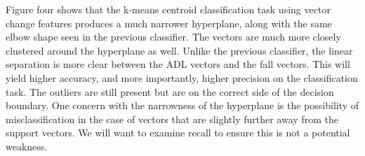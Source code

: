 \documentclass{llncs}
\begin{document}
    
		
	Figure four shows that the k-means centroid classification task using vector change features produces a much narrower hyperplane, along with the same elbow shape seen in the previous classifier. The vectors are much more closely clustered around the hyperplane as well. Unlike the previous classifier, the linear separation is more clear between the ADL vectors and the fall vectors. This will yield higher accuracy, and more importantly, higher precision on the classification task. The outliers are still present but are on the correct side of the decision boundary. One concern with the narrowness of the hyperplane is the possibility of misclassification in the case of vectors that are slightly further away from the support vectors. We will want to examine recall to ensure this is not a potential weakness.
	
\end{document}
